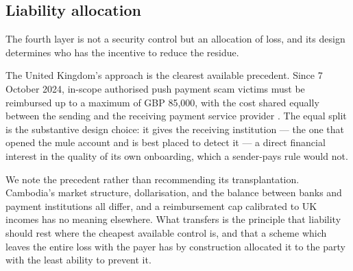 \documentclass[10pt,a4paper,twocolumn]{article}
\begin{document}
\subsection{Liability allocation}
\label{sec:liability}

The fourth layer is not a security control but an allocation of loss, and its
design determines who has the incentive to reduce the residue.

The United Kingdom's approach is the clearest available precedent. Since 7
October 2024, in-scope authorised push payment scam victims must be reimbursed
up to a maximum of GBP 85,000, with the cost shared equally between the sending
and the receiving payment service provider \citep{psr2024app}. The equal split is
the substantive design choice: it gives the receiving institution --- the one that
opened the mule account and is best placed to detect it --- a direct financial
interest in the quality of its own onboarding, which a sender-pays rule would
not.

We note the precedent rather than recommending its transplantation. Cambodia's
market structure, dollarisation, and the balance between banks and payment
institutions all differ, and a reimbursement cap calibrated to UK incomes has no
meaning elsewhere. What transfers is the principle that liability should rest
where the cheapest available control is, and that a scheme which leaves the
entire loss with the payer has by construction allocated it to the party with
the least ability to prevent it.
\end{document}
